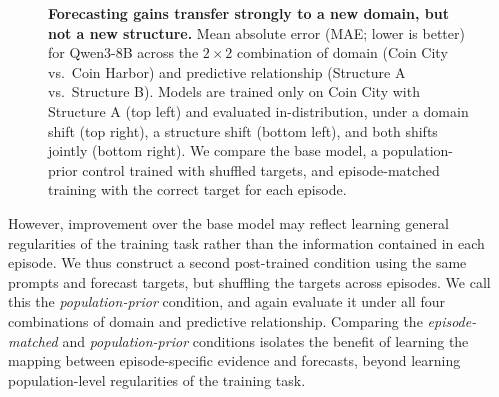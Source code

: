 \documentclass{article}
\begin{document}
\begin{figure}[!]
{%
}
\caption{\textbf{Forecasting gains transfer strongly to a new domain, but not a new structure.} Mean absolute error (MAE; lower is better) for Qwen3-8B across the $2\times2$
combination of domain (Coin City vs.\ Coin Harbor) and predictive relationship
(Structure A vs.\ Structure B). Models are trained only on Coin City with
Structure A (top left) and evaluated in-distribution, under a domain shift
(top right), a structure shift (bottom left), and both shifts jointly
(bottom right). We compare the base model, a population-prior control trained with shuffled targets, and episode-matched training with the correct target for
each episode.
}
\label{fig:exp3-transfer-results}
\vspace{10pt}
\end{figure}

However, improvement over the base model may reflect learning general regularities of the training task rather than the information contained in each episode. We thus construct a second post-trained condition using the same prompts and forecast targets, but shuffling the targets across episodes. We call this the \textit{population-prior} condition, and again evaluate it under all four combinations of domain and predictive relationship. Comparing the \textit{episode-matched} and \textit{population-prior} conditions isolates the benefit of learning the mapping between episode-specific evidence and forecasts, beyond learning population-level regularities of the training task.


\end{document}
